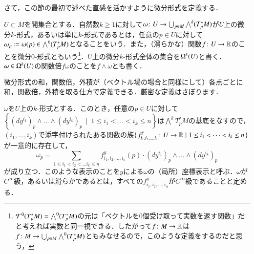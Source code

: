 さて，この節の最初で述べた直感を活かすように微分形式を定義する．

\begin{defi}
$U \subset M$を開集合とする．自然数$k \geq 1$に対して$\omega \colon U \to \bigcup_{p \in M} \bigwedge^k(T_p^*M)$が$U$上の微分$k$-形式，あるいは単に$k$-形式であるとは，任意の$p \in U$に対して$\omega_p \coloneqq \omega(p) \in \bigwedge^k(T_p^*M)$となることをいう．また，（滑らかな）関数$f \colon U \to \mathbb{R}$のことを微分0-形式ともいう\footnote{$\mathcal{T}^0(T^*_pM) = \bigwedge^0(T^*_pM)$の元は「ベクトルを$0$個受け取って実数を返す関数」だと考えれば実数と同一視できる．したがって$f \colon M \to \mathbb{R}$は$f \colon M \to \bigcup_{p \in M} \bigwedge^0 (T^*_pM)$ともみなせるので，このような定義をするのだと思う，}．$U$上の微分$k$-形式全体の集合を$\Omega^k(U)$と書く．$\omega \in \Omega^k(U)$の関数倍$f\omega$のことを$f \wedge \omega$とも書く．
\end{defi}

\begin{que}
微分形式の和，関数倍，外積が（ベクトル場の場合と同様にして）各点ごとに和，関数倍，外積を取る仕方で定義できる．厳密な定義はさぼります．
\end{que}

\begin{defi}
$\omega$を$U$上の$k$-形式とする．このとき，任意の$p \in U$に対して$\left\{ \left( dy^{i_1} \right)_p \wedge \dots \wedge \left( dy^{i_k} \right)_p \ \mid \ 1 \leq i_1 < \dots < i_k \leq n \right\}$は$\bigwedge^k T^*_pM$の基底をなすので，$(i_1, \dots, i_k)$で添字付けられたある関数の族$\set{ f^y_{i_1,i_2,\dots,i_n} \colon U \to \mathbb{R}| 1 \leq i_1 < \dots < i_k \leq n }$が一意的に存在して，
\begin{equation}
\omega_p = \sum_{1 \leq i_1 < i_2 < \dots i_k \leq n} {f^y_{i_1,i_2,\dots,i_n}}(p) \cdot \left( dy^{i_1} \right)_p \wedge \dots \wedge \left( dy^{i_k} \right)_p
\end{equation}が成り立つ．このような表示のことを$y$による$\omega$の（局所）座標表示と呼ぶ．$\omega$が$C^\infty$級，あるいは滑らかであるとは，すべての$f^y_{i_1,i_2,\dots,i_n}$が$C^\infty$級であることと定める．
\end{defi}

